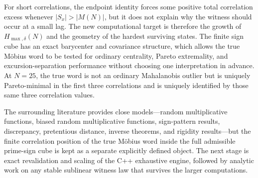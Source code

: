 \documentclass[11pt]{article}
\begin{document}
For short correlations, the endpoint identity forces some positive total correlation excess whenever $|S_x|>|M(N)|$, but it does not explain why the witness should occur at a small lag. The new computational target is therefore the growth of $H_{\max,\delta}(N)$ and the geometry of the hardest surviving states. The finite sign cube has an exact barycenter and covariance structure, which allows the true Möbius word to be tested for ordinary centrality, Pareto extremality, and excursion-separation performance without choosing one interpretation in advance. At $N=25$, the true word is not an ordinary Mahalanobis outlier but is uniquely Pareto-minimal in the first three correlations and is uniquely identified by those same three correlation values.

The surrounding literature provides close models---random multiplicative functions, biased random multiplicative functions, sign-pattern results, discrepancy, pretentious distance, inverse theorems, and rigidity results---but the finite correlation position of the true Möbius word inside the full admissible prime-sign cube is kept as a separate explicitly defined object. The next stage is exact revalidation and scaling of the C++ exhaustive engine, followed by analytic work on any stable sublinear witness law that survives the larger computations.
\end{document}

